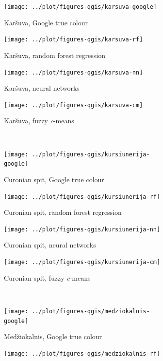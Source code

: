 \documentclass[a4paper,10pt]{book}
\begin{document}
\begin{figure}
  \ContinuedFloat
  \centering
  \begin{subfigure}[b]{.23\textwidth}
    \texttt{[image: ../plot/figures-qgis/karsuva-google]}
    \caption{Kar\v{s}uva, Google true colour}
  \end{subfigure} \hfill
  \begin{subfigure}[b]{.23\textwidth}
    \texttt{[image: ../plot/figures-qgis/karsuva-rf]}
    \caption{Kar\v{s}uva, random forest regression}
    \label{subfig-karsuva-rf}
  \end{subfigure} \hfill
  \begin{subfigure}[b]{.23\textwidth}
    \texttt{[image: ../plot/figures-qgis/karsuva-nn]}
    \caption{Kar\v{s}uva, neural networks}
  \end{subfigure} \hfill
  \begin{subfigure}[b]{.23\textwidth}
    \texttt{[image: ../plot/figures-qgis/karsuva-cm]}
    \caption{Kar\v{s}uva, fuzzy \textit{c}-means}
    \label{subfig-karsuva-cm}
  \end{subfigure} \
  \begin{subfigure}[b]{.23\textwidth}
    \texttt{[image: ../plot/figures-qgis/kursiunerija-google]}
    \caption{Curonian spit, Google true colour}
  \end{subfigure} \hfill
  \begin{subfigure}[b]{.23\textwidth}
    \texttt{[image: ../plot/figures-qgis/kursiunerija-rf]}
    \caption{Curonian spit, random forest regression}
    \label{subfig-kursiunerija-rf}
  \end{subfigure} \hfill
  \begin{subfigure}[b]{.23\textwidth}
    \texttt{[image: ../plot/figures-qgis/kursiunerija-nn]}
    \caption{Curonian spit, neural networks}
  \end{subfigure} \hfill
  \begin{subfigure}[b]{.23\textwidth}
    \texttt{[image: ../plot/figures-qgis/kursiunerija-cm]}
    \caption{Curonian spit, fuzzy \textit{c}-means}
    \label{subfig-kursiunerija-cm}
  \end{subfigure} \
  \begin{subfigure}[b]{.23\textwidth}
    \texttt{[image: ../plot/figures-qgis/medziokalnis-google]}
    \caption{Med\v{z}iokalnis, Google true colour}
  \end{subfigure} \hfill
  \begin{subfigure}[b]{.23\textwidth}
    \texttt{[image: ../plot/figures-qgis/medziokalnis-rf]}

\end{subfigure}
\end{figure}
\end{document}
